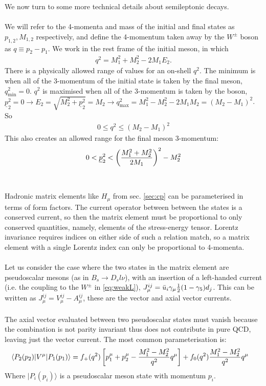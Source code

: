 \documentclass[a4paper,10pt]{article}
\numberwithin{equation}{section}
\begin{document}
We now turn to some more technical details about semileptonic decays.
\\ \\
We will refer to the 4-momenta and mass of the initial and final states as $p_{1,2},M_{1,2}$ respectively, and define the 4-momentum taken away by the $W^{\pm}$ boson as $q \equiv p_2 - p_1$. We work in the rest frame of the initial meson, in which
\begin{align}
	q^2 = M_1^2 + M_2^2 - 2M_1 E_2.
\end{align}
There is a physically allowed range of values for an on-shell $q^2$. The minimum is when all of the 3-momentum of the initial state is taken by the final meson, $q_{\text{min}} ^2 = 0$. $q^2$ is maximised when all of the 3-momentum is taken by the boson, $\underline{p}_2^2 = 0 \rightarrow E_2 = \sqrt{M_2^2 + \underline{p}_2^2 } = M_2 \rightarrow q_{\text{max}}^2 = M_1^2 - M_2^2 - 2M_1M_2 = ( M_2 - M_1 )^2$. So
\begin{align}
	0 \leq q^2 \leq ( M_2 - M_1 )^2
\end{align}
This also creates an allowed range for the final meson 3-momentum:
\begin{align}
	0 < \underline{p}_{2}^2 < \left( M_1^2 + M_2^2 \over 2M_1 \right)^2 - M_2^2
\end{align}
\\ \\
Hadronic matrix elements like $H_{\mu}$ from sec. \ref{sec:cp} can be parameterised in terms of form factors. The current operator between between the states is a conserved current, so then the matrix element must be proportional to only conserved quantities, namely, elements of the stress-energy tensor. Lorentz invariance requires indices on either side of such a relation match, so a matrix element with a single Lorentz index can only be proportional to 4-momenta.
\\ \\
Let us consider the case where the two states in the matrix element are pseudoscalar mesons (as in $B_s\to D_s l\nu$), with an insertion of a left-handed current (i.e. the coupling to the $W^{\pm}$ in \eqref{eq:weakL}), $J_{\mu}^{ij} = \bar{u}_i \gamma_{\mu} {1\over2}(1-\gamma_5) d_j$. This can be written as $J^{ij}_{\mu} = V^{ij}_{\mu} - A^{ij}_{\mu}$, these are the vector and axial vector currents. 
\\ \\
The axial vector evaluated between two pseudoscalar states must vanish because the combination is not parity invariant thus does not contribute in pure QCD, leaving just the vector current. The most common parameterisation is:
\begin{align}
\label{eq:formfactors}
\langle P_2 (p_2) | V^{\mu} | P_1 (p_1) \rangle  &= f_{+} (q^2) \left[ p_1^{\mu} + p_2^{\mu} - {M_1^2 - M_2^2 \over q^2} q^{\mu} \right] + f_0(q^2) {M_1^2 - M_2^2 \over q^2 } q^{\mu}
\end{align}
Where $|P_i(p_i)\rangle$ is a pseudoscalar meson state with momentum $p_i$.
\end{document}
